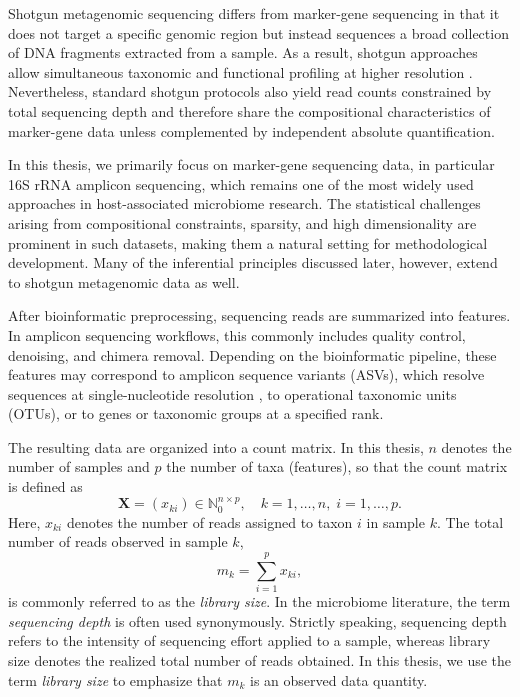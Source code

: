 Shotgun metagenomic sequencing differs from marker-gene sequencing in that it does not target a specific genomic region but instead sequences a broad collection of DNA fragments extracted from a sample. As a result, shotgun approaches allow simultaneous taxonomic and functional profiling at higher resolution \citep{quince2017shotgun}. Nevertheless, standard shotgun protocols also yield read counts constrained by total sequencing depth and therefore share the compositional characteristics of marker-gene data unless complemented by independent absolute quantification.

In this thesis, we primarily focus on marker-gene sequencing data, in particular 16S rRNA amplicon sequencing, which remains one of the most widely used approaches in host-associated microbiome research. The statistical challenges arising from compositional constraints, sparsity, and high dimensionality are prominent in such datasets, making them a natural setting for methodological development. Many of the inferential principles discussed later, however, extend to shotgun metagenomic data as well.

After bioinformatic preprocessing, sequencing reads are summarized into features. In amplicon sequencing workflows, this commonly includes quality control, denoising, and chimera removal. Depending on the bioinformatic pipeline, these features may correspond to amplicon sequence variants (ASVs), which resolve sequences at single-nucleotide resolution \citep{callahan2016dada2}, to operational taxonomic units (OTUs), or to genes or taxonomic groups at a specified rank. 

The resulting data are organized into a count matrix. 
In this thesis, $n$ denotes the number of samples and $p$ the number of taxa (features), so that the count matrix is defined as
\begin{equation}
\label{eq:micro:count_matrix}
    \mathbf{X} = (x_{ki}) \in \mathbb{N}_0^{n \times p}, 
    \quad k = 1, \dots, n, \; i = 1, \dots, p.
\end{equation}
Here, $x_{ki}$ denotes the number of reads assigned to taxon $i$ in sample $k$. 
The total number of reads observed in sample $k$,
\begin{equation}
	\label{eq:micro:library_size}
    m_k = \sum_{i=1}^{p} x_{ki},
\end{equation}
is commonly referred to as the \emph{library size}. 
In the microbiome literature, the term \emph{sequencing depth} is often used synonymously. 
Strictly speaking, sequencing depth refers to the intensity of sequencing effort applied to a sample, whereas library size denotes the realized total number of reads obtained. 
In this thesis, we use the term \emph{library size} to emphasize that $m_k$ is an observed data quantity.

